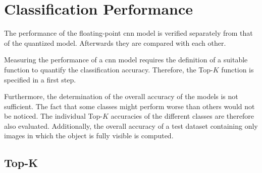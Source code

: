 \section{Classification Performance}
\label{sec:verification_and_benchmark:classification_performance}

The performance of the floating-point \acrshort{cnn} model is verified separately from that of the quantized model.
Afterwards they are compared with each other.

Measuring the performance of a \acrshort{cnn} model requires the definition of a suitable function to quantify the classification accuracy.
Therefore, the Top-$K$ function is specified in a first step.

Furthermore, the determination of the overall accuracy of the models is not sufficient.
The fact that some classes might perform worse than others would not be noticed.
The individual Top-$K$ accuracies of the different classes are therefore also evaluated.
Additionally, the overall accuracy of a test dataset containing only images in which the object is fully visible is computed.

\subsection{Top-K}
\label{subsec:verification_and_benchmark:classification_performance:topk}

